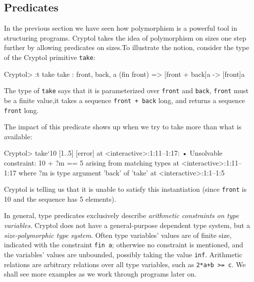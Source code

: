 \subsection{Predicates}
\label{sec:predicates}


In the previous section we have seen how polymorphism is a powerful
tool in structuring programs. Cryptol takes the idea of polymorphism
on sizes one step further by allowing predicates on
sizes.\indPredicates To illustrate the notion, consider the type of
the Cryptol primitive {\tt take}\indTake:
\restartrepl
\begin{replPrompt}
  Cryptol> :t take
  take : {front, back, a} (fin front) => [front + back]a -> [front]a
\end{replPrompt}

The type of {\tt take} says that it is parameterized over {\tt front}
and {\tt back}, {\tt front} must be a finite value,\indFin it takes a
sequence {\tt front + back} long, and returns a sequence {\tt front} long.

The impact of this predicate shows up when we try to take more than
what is available:
\restartrepl
\begin{replPrompt}
  Cryptol> take`{10} [1..5]
  [error] at <interactive>:1:11--1:17:
    • Unsolvable constraint:
        10 + ?m == 5
          arising from
          matching types
          at <interactive>:1:11--1:17
    where
    ?m is type argument 'back' of 'take' at <interactive>:1:1--1:5
\end{replPrompt}
Cryptol is telling us that it is unable to satisfy this instantiation
(since {\tt front} is 10 and the sequence has 5
elements).\indTake\indPredicates

In general, type predicates exclusively describe \textit{arithmetic
  constraints on type variables}.  Cryptol does not have a
general-purpose dependent type system, but a \emph{size-polymorphic
  type system}.  Often type variables' values are of finite size,
indicated with the constraint {\tt fin a}\indFin; otherwise no
constraint is mentioned, and the variables' values are unbounded,
possibly taking the value \texttt{inf}\indInf.  Arithmetic
relations are arbitrary relations over all type variables, such as
{\tt 2*a+b >= c}.  We shall see more examples as we work through
programs later on.


